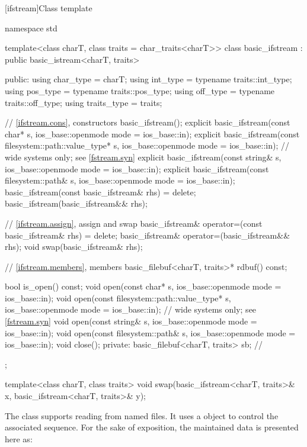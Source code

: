 [ifstream]{Class template }

%
\begin{codeblock}
namespace std {
  template<class charT, class traits = char_traits<charT>>
  class basic_ifstream : public basic_istream<charT, traits> {
  public:
    using char_type   = charT;
    using int_type    = typename traits::int_type;
    using pos_type    = typename traits::pos_type;
    using off_type    = typename traits::off_type;
    using traits_type = traits;

    // \ref{ifstream.cons}, constructors
    basic_ifstream();
    explicit basic_ifstream(const char* s,
                            ios_base::openmode mode = ios_base::in);
    explicit basic_ifstream(const filesystem::path::value_type* s,
                            ios_base::openmode mode = ios_base::in);  // wide systems only; see \ref{fstream.syn}
    explicit basic_ifstream(const string& s,
                            ios_base::openmode mode = ios_base::in);
    explicit basic_ifstream(const filesystem::path& s,
                            ios_base::openmode mode = ios_base::in);
    basic_ifstream(const basic_ifstream& rhs) = delete;
    basic_ifstream(basic_ifstream&& rhs);

    // \ref{ifstream.assign}, assign and swap
    basic_ifstream& operator=(const basic_ifstream& rhs) = delete;
    basic_ifstream& operator=(basic_ifstream&& rhs);
    void swap(basic_ifstream& rhs);

    // \ref{ifstream.members}, members
    basic_filebuf<charT, traits>* rdbuf() const;

    bool is_open() const;
    void open(const char* s, ios_base::openmode mode = ios_base::in);
    void open(const filesystem::path::value_type* s,
              ios_base::openmode mode = ios_base::in);  // wide systems only; see \ref{fstream.syn}
    void open(const string& s, ios_base::openmode mode = ios_base::in);
    void open(const filesystem::path& s, ios_base::openmode mode = ios_base::in);
    void close();
  private:
    basic_filebuf<charT, traits> sb; // \expos
  };

  template<class charT, class traits>
    void swap(basic_ifstream<charT, traits>& x,
              basic_ifstream<charT, traits>& y);
}
\end{codeblock}

\pnum
The class
supports reading from named files.
It uses a
object to control the associated
sequence.
For the sake of exposition, the maintained data is presented here as:

